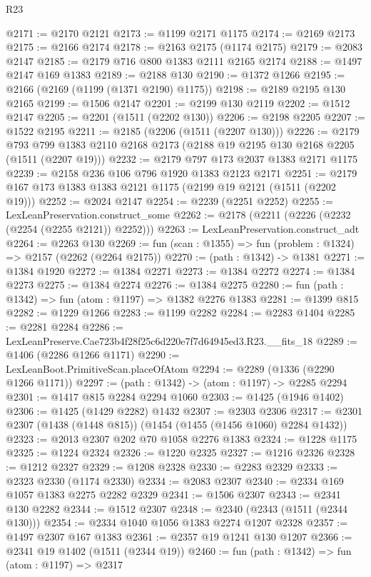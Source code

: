 \begin{lexlean}{R23}
\begin{coremodule}
@2171 := @2170 @2121
@2173 := @1199 @2171 @1175
@2174 := @2169 @2173
@2175 := @2166 @2174
@2178 := @2163 @2175 (@1174 @2175)
@2179 := @2083 @2147
@2185 := @2179 @716 @800 @1383 @2111 @2165 @2174
@2188 := @1497 @2147 @169 @1383
@2189 := @2188 @130
@2190 := @1372 @1266
@2195 := @2166 (@2169 (@1199 (@1371 @2190) @1175))
@2198 := @2189 @2195 @130 @2165
@2199 := @1506 @2147
@2201 := @2199 @130 @2119
@2202 := @1512 @2147
@2205 := @2201 (@1511 (@2202 @130))
@2206 := @2198 @2205
@2207 := @1522 @2195
@2211 := @2185 (@2206 (@1511 (@2207 @130)))
@2226 := @2179
    @793
    @799
    @1383
    @2110
    @2168
    @2173
    (@2188 @19 @2195 @130 @2168 @2205 (@1511 (@2207 @19)))
@2232 := @2179 @797 @173 @2037 @1383 @2171 @1175
@2239 := @2158 @236 @106 @796 @1920 @1383 @2123 @2171
@2251 := @2179 @167 @173 @1383 @1383 @2121 @1175 (@2199 @19 @2121 (@1511 (@2202 @19)))
@2252 := @2024 @2147
@2254 := @2239 (@2251 @2252)
@2255 := LexLeanPreservation.construct_some
@2262 := @2178 (@2211 (@2226 (@2232 (@2254 (@2255 @2121)) @2252)))
@2263 := LexLeanPreservation.construct_adt
@2264 := @2263 @130
@2269 := fun (scan : @1355) => fun (problem : @1324) => @2157 (@2262 (@2264 @2175))
@2270 := (path : @1342) -> @1381
@2271 := @1384 @1920
@2272 := @1384 @2271
@2273 := @1384 @2272
@2274 := @1384 @2273
@2275 := @1384 @2274
@2276 := @1384 @2275
@2280 := fun (path : @1342) => fun (atom : @1197) => @1382 @2276 @1383
@2281 := @1399 @815
@2282 := @1229 @1266
@2283 := @1199 @2282
@2284 := @2283 @1404
@2285 := @2281 @2284
@2286 := LexLeanPreserve.Cae723b4f28f25c6d220e7f7d64945ed3.R23.__fits_18
@2289 := @1406 (@2286 @1266 @1171)
@2290 := LexLeanBoot.PrimitiveScan.placeOfAtom
@2294 := @2289 (@1336 (@2290 @1266 @1171))
@2297 := (path : @1342) -> (atom : @1197) -> @2285 @2294
@2301 := @1417 @815 @2284 @2294 @1060
@2303 := @1425 (@1946 @1402)
@2306 := @1425 (@1429 @2282) @1432
@2307 := @2303 @2306
@2317 := @2301 @2307 (@1438 (@1448 @815)) (@1454 (@1455 (@1456 @1060) @2284 @1432))
@2323 := @2013 @2307 @202 @70 @1058 @2276 @1383
@2324 := @1228 @1175
@2325 := @1224 @2324
@2326 := @1220 @2325
@2327 := @1216 @2326
@2328 := @1212 @2327
@2329 := @1208 @2328
@2330 := @2283 @2329
@2333 := @2323 @2330 (@1174 @2330)
@2334 := @2083 @2307
@2340 := @2334 @169 @1057 @1383 @2275 @2282 @2329
@2341 := @1506 @2307
@2343 := @2341 @130 @2282
@2344 := @1512 @2307
@2348 := @2340 (@2343 (@1511 (@2344 @130)))
@2354 := @2334 @1040 @1056 @1383 @2274 @1207 @2328
@2357 := @1497 @2307 @167 @1383
@2361 := @2357 @19 @1241 @130 @1207
@2366 := @2341 @19 @1402 (@1511 (@2344 @19))
@2460 := fun (path : @1342) =>
  fun (atom : @1197) =>
  @2317

\end{coremodule}
\end{lexlean}
